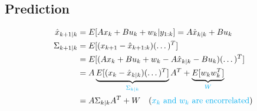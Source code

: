\documentclass[11pt]{article}
\begin{document}
\subsection{Prediction}
\begin{align*}
    \hat{x}_{k+1|k} &= E[Ax_k + Bu_k + w_k|y_{1:k}] = A\hat{x}_{k|k} + Bu_k
    \\
    \Sigma_{k+1|k} &= E[(x_{k+1}-\hat{x}_{k+1:k})(\dots)^T]
    \\
    &= E[(Ax_k + Bu_k +w_k - A\hat{x}_{k|k} - Bu_k)(\dots)^T]
    \\
    &= A\underbrace{E[(x_k-\hat{x}_{k|k})(\dots)^T]}_{\textcolor{cyan}{\Sigma_{k|k}}} A^T + \underbrace{E[w_kw_k^T]}_{\textcolor{cyan}{W}}
    \\
    &= A\Sigma_{k|k}A^T + W \quad(\textcolor{cyan}{x_k\text{ and }w_k \text{ are encorrelated}})
\end{align*}
\end{document}
